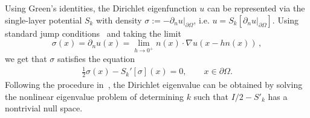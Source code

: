 \documentclass{amsart}
\newcommand{\pO}{{\partial\Omega}}
\theoremstyle{plain}
\begin{document}
Using Green's identities, the Dirichlet eigenfunction $u$ can be represented via the single-layer potential $S_k$ with density $\sigma:=-\partial_n u|_{\partial\Omega}$, i.e. $u = S_{k}[\partial_{n} u|_{\partial \Omega}]$.
  Using standard jump conditions~\cite{colton2013integral} and taking the limit
  \begin{equation}
  \sigma(x) = \partial_{n}u(x) = \lim_{h \to 0^{+}} n(x) \cdot \nabla u(x - h n(x)) \,,
  \end{equation}
  we get that $\sigma$ satisfies the equation
    \begin{align}
\label{eqn: bie_eig_sprime}
    \frac{1}{2}\sigma(x) - S_k'[\sigma](x) = 0,
    \qquad x \in \pO.
    \end{align}
Following the procedure in~\cite{zhao2015robust}, the Dirichlet eigenvalue can be obtained by solving the nonlinear eigenvalue problem of determining $k$ such that $I/2 - S'_{k}$ has a nontrivial null space. 
\end{document}

